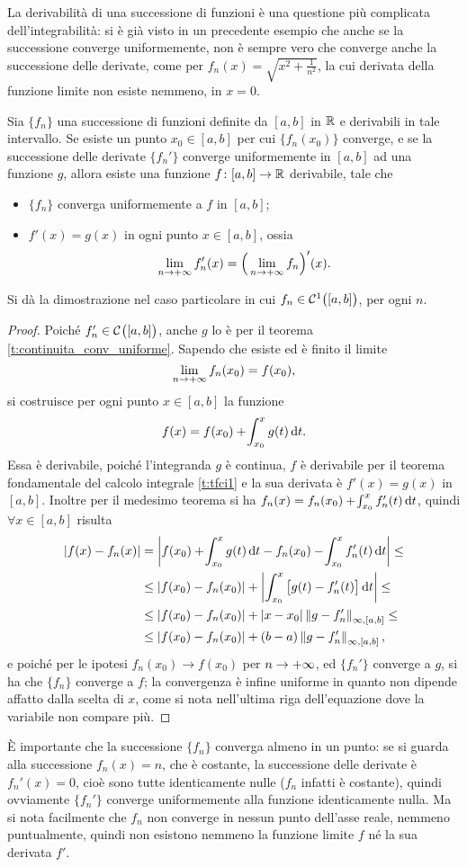 La derivabilità di una successione di funzioni è una questione più complicata dell'integrabilità: si è già visto in un precedente esempio che anche se la successione converge uniformemente, non è sempre vero che converge anche la successione delle derivate, come per $f_n(x)=\sqrt{x^2+\frac1{n^2}}$, la cui derivata della funzione limite non esiste nemmeno, in $x=0$.
\begin{teorema} \label{t:scambio_derivata_limite}
Sia $\{f_n\}$ una successione di funzioni definite da $[a,b]$ in $\mathbb{R}$ e derivabili in tale intervallo. Se esiste un punto $x_0\in[a,b]$ per cui $\{f_n(x_0)\}$ converge, e se la successione delle derivate $\{f_n'\}$ converge uniformemente in $[a,b]$ ad una funzione $g$, allora esiste una funzione $f\colon[a,b]\to\mathbb{R}$ derivabile, tale che
\begin{itemize}
\item $\{f_n\}$ converga uniformemente a $f$ in $[a,b]$;
\item $f'(x)=g(x)$ in ogni punto $x\in[a,b]$, ossia
\[
\lim_{n\to+\infty}f'_n(x)=\Big(\lim_{n\to+\infty}f_n\Big)'(x).
\]
\end{itemize}
\end{teorema}
Si dà la dimostrazione nel caso particolare in cui $f_n\in\mathcal{C}^{{1}}\big([a,b]\big)$, per ogni $n$.
\begin{proof}
Poiché $f_n'\in\mathcal{C}^{{}}\big([a,b]\big)$, anche $g$ lo è per il teorema \ref{t:continuita_conv_uniforme}. Sapendo che esiste ed è finito il limite
\[
\lim_{n\to+\infty}f_n(x_0)=f(x_0),
\]
si costruisce per ogni punto $x\in[a,b]$ la funzione
\[
f(x)=f(x_0)+\!\int_{x_0}^xg(t)\,\textup{d} t.
\]
Essa è derivabile, poiché l'integranda $g$ è continua, $f$ è derivabile per il teorema fondamentale del calcolo integrale \ref{t:tfci1} e la sua derivata è $f'(x)=g(x)$ in $[a,b]$. Inoltre per il medesimo teorema si ha $f_n(x)=f_n(x_0)+\!\int_{x_0}^xf_n'(t)\,\textup{d} t$, quindi $\forall x\in[a,b]$ risulta
\[\begin{split}
\left|{f(x)-f_n(x)}\right|	&=\left|{f(x_0)+\!\int_{x_0}^xg(t)\,\textup{d} t-f_n(x_0)-\!\int_{x_0}^xf_n'(t)\,\textup{d} t}\right|\leq\\
				&\leq\left|{f(x_0)-f_n(x_0)}\right|+\left|{\int_{x_0}^x\big[g(t)-f_n'(t)\big]\,\textup{d} t}\right|\leq\\
				&\leq\left|{f(x_0)-f_n(x_0)}\right|+\left|{x-x_0}\right|\left\|{g-f_n'}\right\|_{\infty,[a,b]}\leq\\
				&\leq\left|{f(x_0)-f_n(x_0)}\right|+(b-a)\left\|{g-f_n'}\right\|_{\infty,[a,b]},
\end{split}\]
e poiché per le ipotesi $f_n(x_0)\to f(x_0)$ per $n\to+\infty$, ed $\{f_n'\}$ converge a $g$, si ha che $\{f_n\}$ converge a $f$; la convergenza è infine uniforme in quanto non dipende affatto dalla scelta di $x$, come si nota nell'ultima riga dell'equazione dove la variabile non compare più.
\end{proof}
È importante che la successione $\{f_n\}$ converga almeno in un punto: se si guarda alla successione $f_n(x)=n$, che è costante, la successione delle derivate è $f_n'(x)=0$, cioè sono tutte identicamente nulle ($f_n$ infatti è costante), quindi ovviamente $\{f_n'\}$ converge uniformemente alla funzione identicamente nulla. Ma si nota facilmente che $f_n$ non converge in nessun punto dell'asse reale, nemmeno puntualmente, quindi non esistono nemmeno la funzione limite $f$ né la sua derivata $f'$.

